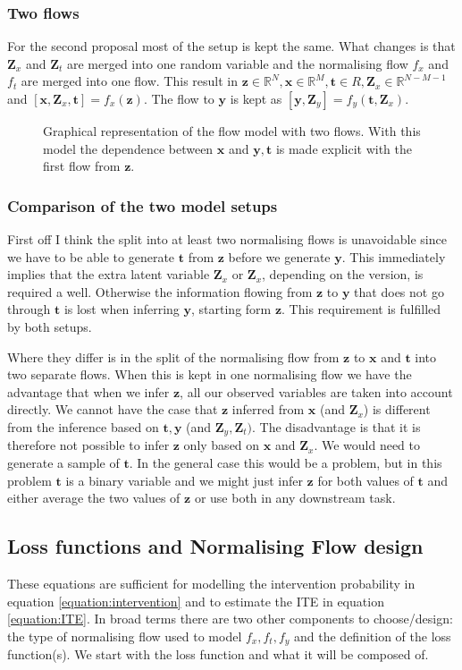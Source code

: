 \documentclass{article}
\newcommand{\R}{\mathbb{R}}
\newcommand{\bt}{\mathbf{t}}
\newcommand{\bx}{\mathbf{x}}
\newcommand{\by}{\mathbf{y}}
\newcommand{\bZ}{\mathbf{Z}}
\newcommand{\bz}{\mathbf{z}}
\begin{document}
\subsubsection{Two flows}
For the second proposal most of the setup is kept the same. What changes is that $\bZ_x$ and $\bZ_t$ are merged into one random variable and the normalising flow $f_x$ and $f_t$ are merged into one flow. This result in $\bz \in \R^N, \bx \in \R^M, \bt \in R, \bZ_x \in \R^{N-M-1}$ and $[\bx, \bZ_x, \bt] = f_x(\bz)$. The flow to $\by$ is kept as $[\by, \bZ_y] = f_y(\bt, \bZ_x)$. 

\begin{figure}
    \centering
    
    \caption{Graphical representation of the flow model with two flows. With this model the dependence between $\bx$ and $\by, \bt$ is made explicit with the first flow from $\bz$.}
    \label{fig:flow_graph_three_flows}
\end{figure}

\subsubsection{Comparison of the two model setups}
First off I think the split into at least two normalising flows is unavoidable since we have to be able to generate $\bt$ from $\bz$ before we generate $\by$. This  immediately implies that the extra latent variable $\bZ_x$ or $\bZ_x$, depending on the version, is required a well. Otherwise the information flowing from $\bz$ to $\by$ that does not go through $\bt$ is lost when inferring $\by$, starting form $\bz$. This requirement is fulfilled by both setups. 

Where they differ is in the split of the normalising flow from $\bz$ to $\bx$ and $\bt$ into two separate flows. When this is kept in one normalising flow we have the advantage that when we infer $\bz$, all our observed variables are taken into account directly. We cannot have the case that $\bz$ inferred from $\bx$ (and $\bZ_x$) is different from the inference based on $\bt, \by$ (and $\bZ_y, \bZ_t)$. The disadvantage is that it is therefore not possible to infer $\bz$ only based on $\bx$ and $\bZ_x$. We would need to generate a sample of $\bt$. In the general case this would be a problem, but in this problem $\bt$ is a binary variable and we might just infer $\bz$ for both values of $\bt$ and either average the two values of $\bz$ or use both in any downstream task.


\subsection{Loss functions and Normalising Flow design}
These equations are sufficient for modelling the intervention probability in equation \ref{equation:intervention} and to estimate the ITE in equation \ref{equation:ITE}. In broad terms there are two other components to choose/design: the type of normalising flow used to model $f_x, f_t, f_y$ and the definition of the loss function(s). We start with the loss function and what it will be composed of.
\end{document}
